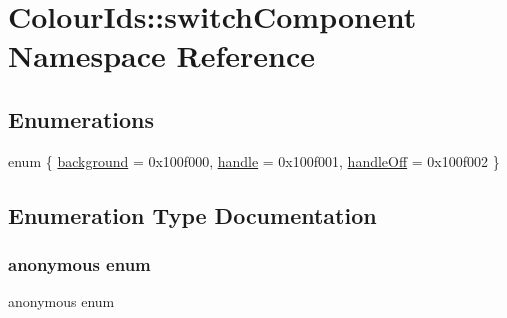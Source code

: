 \hypertarget{namespaceColourIds_1_1switchComponent}{}\section{Colour\+Ids\+:\+:switch\+Component Namespace Reference}
\label{namespaceColourIds_1_1switchComponent}
\subsection*{Enumerations}
\begin{DoxyCompactItemize}
\item 
enum \{ \mbox{\hyperlink{namespaceColourIds_1_1switchComponent_a6bcd720b26222d5f5ed3f21dcc4109bdab86f668389d94eedf8b95229f5e5adf3}{background}} = 0x100f000, 
\mbox{\hyperlink{namespaceColourIds_1_1switchComponent_a6bcd720b26222d5f5ed3f21dcc4109bdab6cd7726416d6ee8f51e7fc769a50101}{handle}} = 0x100f001, 
\mbox{\hyperlink{namespaceColourIds_1_1switchComponent_a6bcd720b26222d5f5ed3f21dcc4109bdaff020060977addd5dfd568e98b6fb51d}{handle\+Off}} = 0x100f002
 \}
\end{DoxyCompactItemize}


\subsection{Enumeration Type Documentation}
\mbox{\label{namespaceColourIds_1_1switchComponent_a6bcd720b26222d5f5ed3f21dcc4109bd}} 
\subsubsection{\texorpdfstring{anonymous enum}{anonymous enum}}
{\footnotesize\ttfamily anonymous enum}

